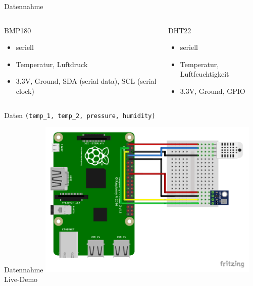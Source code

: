 \begin{frame}[t]{Datennahme}

  \begin{columns}[t,onlytextwidth]
    \begin{column}{0.48\textwidth}
      \begin{block}{BMP180}
        \begin{itemize}
          \item seriell
          \item Temperatur, Luftdruck
          \item 3.3V, Ground, SDA (serial data), SCL (serial clock)
        \end{itemize}
      \end{block}
    \end{column}
    \begin{column}{0.48\textwidth}
      \begin{block}{DHT22}
        \begin{itemize}
          \item seriell
          \item Temperatur, Luftfeuchtigkeit
          \item 3.3V, Ground, GPIO
        \end{itemize}
      \end{block}
    \end{column}
  \end{columns}

  \begin{block}{Daten}
    \centering
    \texttt{(temp\_1, temp\_2, pressure, humidity)}
  \end{block}

\end{frame}

\begin{frame}[t]{Datennahme}
  \centering
  \includegraphics[width=0.8\textwidth]{../weatherstation_rpi2.pdf}
  \vfill
  \flushright\alert{Live-Demo}
\end{frame}
